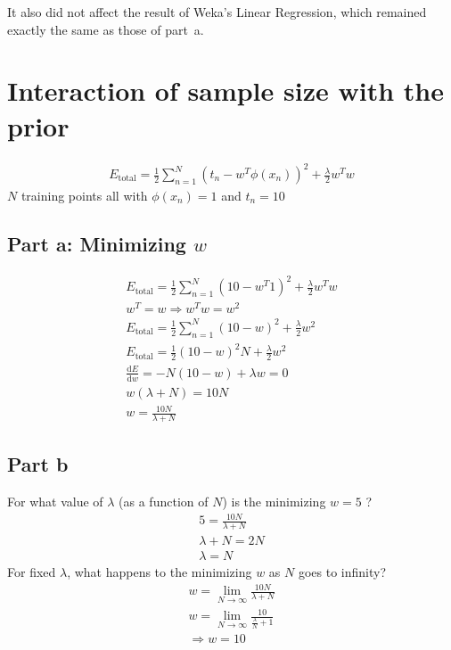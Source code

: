 \documentclass{article}
\begin{document}
It also did not affect the result of Weka's Linear Regression, which remained exactly the same as those of \mbox{part a}. 

\section{Interaction of sample size with the prior}

\begin{align*}
E_{\text{total}} = \frac{1}{2} \sum_{n=1}^{N}\left(  t_{n} - w^{T}\phi\left( x_{n}\right)  \right)^{2} + \frac{\lambda}{2}w^{T} w  
\end{align*}
$N$ training points all with $\phi\left( x_{n} \right) = 1$ and $t_{n} = 10$

\subsection*{Part a: Minimizing $w$}

\begin{align*}
E_{\text{total}} = \frac{1}{2} \sum_{n=1}^{N}\left( 10 - w^{T} 1 \right)^{2} + \frac{\lambda}{2}w^{T} w  \\
w^{T} = w  \Rightarrow w^{T}w = w^{2} \\
E_{\text{total}} = \frac{1}{2} \sum_{n=1}^{N}\left( 10 - w \right)^{2} + \frac{\lambda}{2}w^{2} \\
E_{\text{total}} = \frac{1}{2} \left( 10 - w \right)^{2}N + \frac{\lambda}{2}w^{2} \\
\frac{\text{d}E}{\text{d}w} = -N\left( 10 -w \right) + \lambda w = 0 \\
w\left( \lambda + N \right) = 10N \\
w = \frac{10N}{\lambda + N}
\end{align*}

\subsection*{Part b}
For what value of $\lambda$ (as a function of $N$) is the minimizing $w = 5$ ?
\begin{align*}
5 = \frac{10N}{\lambda + N} \\
\lambda + N = 2N \\
\lambda = N
\end{align*}
For fixed $\lambda$, what happens to the minimizing $w$ as $N$ goes to infinity?
\begin{align*}
w = \lim_{N \rightarrow \infty} \frac{10N}{\lambda + N} \\
w = \lim_{N \rightarrow \infty} \frac{10}{\frac{\lambda}{N} + 1} \\
\Rightarrow w = 10
\end{align*}
\end{document}
